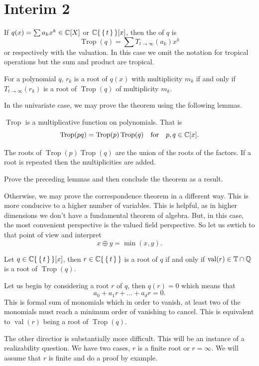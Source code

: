 \documentclass[12pt]{memoir}
\DeclareMathOperator{\val}{val}
\DeclareMathOperator{\Trop}{Trop}
\begin{document}
\section{Interim 2}

\begin{Def}
    If $q(x)=\sum a_kx^k\in\mathbb{C}[X]$ or $\mathbb{C}\{\,\{\,t\,\}\,\}[x]$, then the  of $q$ is 
    $$\Trop(q)=\sum T_{t\to\infty}(a_k)x^k$$
    or respectively with the valuation. In this case we omit the notation for tropical operations but the sum and product are tropical.
\end{Def}

\begin{Th}
For a polynomial $q$, $r_k$ is a root of $q(x)$ with multiplicity $m_k$ if and only if $T_{t\to\infty}(r_k)$ is a root of $\Trop(q)$ of multiplicity $m_k$.
\end{Th}

In the univariate case, we may prove the theorem using the following lemmas.

\begin{Lem}
$\Trop$ is a multiplicative function on polynomials. That is
$$\Trop(pq)=\Trop(p)\Trop(q)\word{for}p,q\in\bC[x].$$
\end{Lem}

\begin{Lem}
The roots of $\Trop(p)\Trop(q)$ are the union of the roots of the factors. If a root is repeated then the multiplicities are added.
\end{Lem}

\begin{Ej}[2]
Prove the preceding lemmas and then conclude the theorem as a result.
\end{Ej}

Otherwise, we may prove the correspondence theorem in a different way. This is more conducive to a higher number of variables. This is helpful, as in higher dimensions we don't have a fundamental theorem of algebra. But, in this case, the most convenient perspective is the valued field perspective. So let us swtich to that point of view and interpret 
$$x\oplus y=\min(x,y).$$

\begin{Th}
Let $q\in\mathbb{C}\{\,\{\,t\,\}\,\}[x]$, then $r\in\mathbb{C}\{\,\{\,t\,\}\,\}$ is a root of $q$ if and only if $\val(r)\in\bT\cap\bQ$ is a root of $\Trop(q)$.
\end{Th}

\begin{ptcbp}
Let us begin by considering a root $r$ of $q$, then $q(r)=0$ which means that 
$$a_0+a_1r+\dots+a_dr=0.$$
This is formal sum of monomials which in order to vanish, at least two of the monomials must reach a minimum order of vanishing to cancel. This is equivalent to $\val(r)$ being a root of $\Trop(q)$. \par %
The other directior is substantially more difficult. This will be an instance of a realizability question. We have two cases, $r$ is a finite root or $r=\infty$. We will assume that $r$ is finite and do a proof by example. 
\end{ptcbp}
\end{document}
